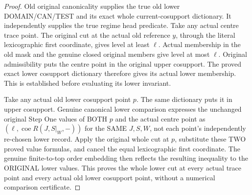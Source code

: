 \begin{proof}
Old original canonicality supplies the true old lower DOMAIN/CAN/TEST and
its exact whole current-cosupport dictionary. It independently supplies the
true regime head predicate. Take any actual centre trace point. The original
cut at the actual old reference $y$, through the literal lexicographic first
coordinate, gives level at least $\ell$. Actual membership in the old mask
and the genuine closed original members give level at most $\ell$.
Original admissibility puts the centre point in the original upper cosupport.
The proved exact lower cosupport dictionary therefore gives its actual
lower membership. This is established before evaluating its lower invariant.

Take any actual old lower cosupport point $p$. The same dictionary puts it
in upper cosupport. Genuine canonical lower comparison expresses the
unchanged original Step One values of BOTH $p$ and the actual centre point
as $(\ell,\operatorname{coe}R(J,S|_W,-))$ for the SAME $J,S,W$, not each
point's independently re-chosen lower record. Apply the original whole cut
at $p$, substitute these TWO proved value formulas, and cancel the equal
lexicographic first coordinate. The genuine finite-to-top order embedding
then reflects the resulting inequality to the ORIGINAL lower values.
This proves the whole lower cut at every actual trace point and every actual
old lower cosupport point, without a numerical comparison certificate.
\end{proof}

